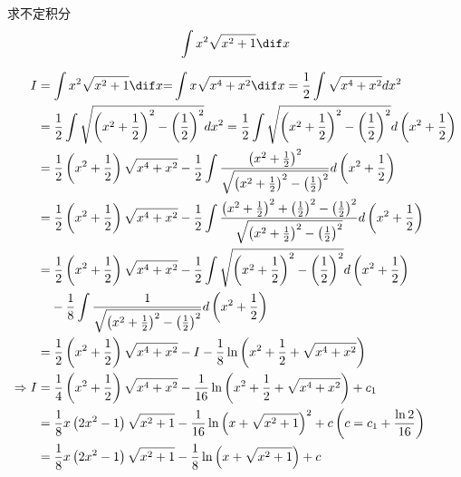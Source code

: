 \documentclass[color=green,titlestyle=hang]{elegantbook}%
\begin{document}
\begin{exercise}求不定积分\[\int {{x^2}} \sqrt {{x^2} + 1} \dif x\]
\end{exercise}\begin{Solution}
\begin{align*}
I &=\int {{x^2}} \sqrt {{x^2} + 1} \dif x{\rm{ = }}\int {x\sqrt {{x^4} + {x^2}} } \dif x = \frac{1}{2}\int {\sqrt {{x^4} + {x^2}} } d{x^2}\\
& = \frac{1}{2}\int {\sqrt {{{\left( {{x^2} + \frac{1}{2}} \right)}^2} - {{\left( {\frac{1}{2}} \right)}^2}} } d{x^2} = \frac{1}{2}\int {\sqrt {{{\left( {{x^2} + \frac{1}{2}} \right)}^2} - {{\left( {\frac{1}{2}} \right)}^2}} } d\left( {{x^2} + \frac{1}{2}} \right)\\
&= \frac{1}{2}\left( {{x^2} + \frac{1}{2}} \right)\sqrt {{x^4} + {x^2}}  - \frac{1}{2}\int {\frac{{{{\left( {{x^2} + \frac{1}{2}} \right)}^2}}}{{\sqrt {{{\left( {{x^2} + \frac{1}{2}} \right)}^2} - {{\left( {\frac{1}{2}} \right)}^2}} }}} d\left( {{x^2} + \frac{1}{2}} \right)\\
&= \frac{1}{2}\left( {{x^2} + \frac{1}{2}} \right)\sqrt {{x^4} + {x^2}}  - \frac{1}{2}\int {\frac{{{{\left( {{x^2} + \frac{1}{2}} \right)}^2} + {{\left( {\frac{1}{2}} \right)}^2} - {{\left( {\frac{1}{2}} \right)}^2}}}{{\sqrt {{{\left( {{x^2} + \frac{1}{2}} \right)}^2} - {{\left( {\frac{1}{2}} \right)}^2}} }}} d\left( {{x^2} + \frac{1}{2}} \right)\\
&= \frac{1}{2}\left( {{x^2} + \frac{1}{2}} \right)\sqrt {{x^4} + {x^2}}  - \frac{1}{2}\int {\sqrt {{{\left( {{x^2} + \frac{1}{2}} \right)}^2} - {{\left( {\frac{1}{2}} \right)}^2}} } d\left( {{x^2} + \frac{1}{2}} \right) \\
&\phantom{=\;}- \frac{1}{8}\int {\frac{1}{{\sqrt {{{\left( {{x^2} + \frac{1}{2}} \right)}^2} - {{\left( {\frac{1}{2}} \right)}^2}} }}} d\left( {{x^2} + \frac{1}{2}} \right)\\
&= \frac{1}{2}\left( {{x^2} + \frac{1}{2}} \right)\sqrt {{x^4} + {x^2}}  - I - \frac{1}{8}\ln \left( {{x^2} + \frac{1}{2} + \sqrt {{x^4} + {x^2}} } \right)\\
\Rightarrow I &=\frac{1}{4}\left( {{x^2} + \frac{1}{2}} \right)\sqrt {{x^4} + {x^2}}  - \frac{1}{{16}}\ln \left( {{x^2} + \frac{1}{2} + \sqrt {{x^4} + {x^2}} } \right) + {c_1}\\
& =\frac{1}{8}x\left( {2{x^2} - 1} \right)\sqrt {{x^2} + 1}  - \frac{1}{{16}}\ln {\left( {x + \sqrt {{x^2} + 1} } \right)^2} + c \left( {c = {c_1} + \frac{{\ln 2}}{{16}}} \right)\\
&=\frac{1}{8}x\left( {2{x^2} - 1} \right)\sqrt {{x^2} + 1}  - \frac{1}{8}\ln \left( {x + \sqrt {{x^2} + 1} } \right) + c
\end{align*}	
\end{Solution}
\end{document}
